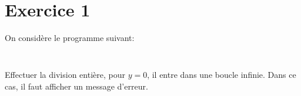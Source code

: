 \documentclass[12pt,a4paper,openany]{book}
\begin{document}
	\thispagestyle{empty} %
	\titleBC 
	\setcounter{tocdepth}{2}
	\setcounter{secnumdepth}{3}
	\tableofcontents
	\chapter{Exercice 1}
	On considère le programme suivant:
	\begin{lstlisting}[language=Algo]
	\end{lstlisting}
	\section{}
	Effectuer la division entière, pour $y=0$, il entre dans
	une boucle infinie. Dans ce cas, il faut afficher un
	message d'erreur.
	\section{}
\end{document}
